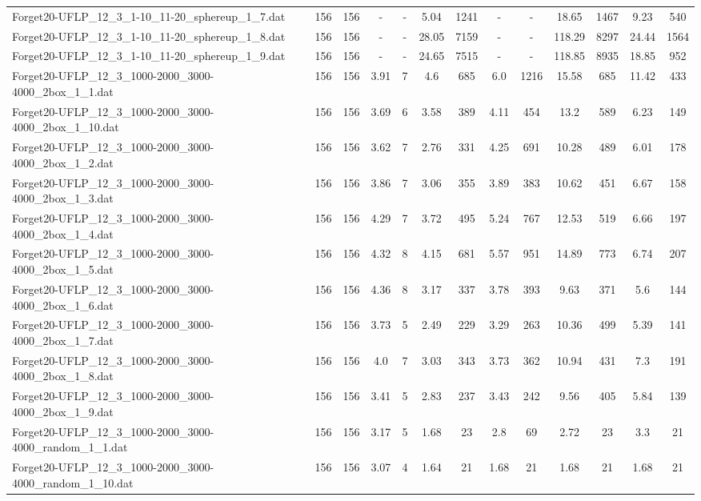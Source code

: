 \begin{table}[!ht]
{\begin{tabular}{lcccccccccccc}
Forget20-UFLP\_12\_3\_1-10\_11-20\_sphereup\_1\_7.dat & 156 & 156 &  - &  - & 5.04 & 1241 &  - &  - & 18.65 & 1467 & 9.23 & 540 \\
Forget20-UFLP\_12\_3\_1-10\_11-20\_sphereup\_1\_8.dat & 156 & 156 &  - &  - & 28.05 & 7159 &  - &  - & 118.29 & 8297 & 24.44 & 1564 \\
Forget20-UFLP\_12\_3\_1-10\_11-20\_sphereup\_1\_9.dat & 156 & 156 &  - &  - & 24.65 & 7515 &  - &  - & 118.85 & 8935 & 18.85 & 952 \\
Forget20-UFLP\_12\_3\_1000-2000\_3000-4000\_2box\_1\_1.dat & 156 & 156 & 3.91 & 7 & 4.6 & 685 & 6.0 & 1216 & 15.58 & 685 & 11.42 & 433 \\
Forget20-UFLP\_12\_3\_1000-2000\_3000-4000\_2box\_1\_10.dat & 156 & 156 & 3.69 & 6 & 3.58 & 389 & 4.11 & 454 & 13.2 & 589 & 6.23 & 149 \\
Forget20-UFLP\_12\_3\_1000-2000\_3000-4000\_2box\_1\_2.dat & 156 & 156 & 3.62 & 7 & 2.76 & 331 & 4.25 & 691 & 10.28 & 489 & 6.01 & 178 \\
Forget20-UFLP\_12\_3\_1000-2000\_3000-4000\_2box\_1\_3.dat & 156 & 156 & 3.86 & 7 & 3.06 & 355 & 3.89 & 383 & 10.62 & 451 & 6.67 & 158 \\
Forget20-UFLP\_12\_3\_1000-2000\_3000-4000\_2box\_1\_4.dat & 156 & 156 & 4.29 & 7 & 3.72 & 495 & 5.24 & 767 & 12.53 & 519 & 6.66 & 197 \\
Forget20-UFLP\_12\_3\_1000-2000\_3000-4000\_2box\_1\_5.dat & 156 & 156 & 4.32 & 8 & 4.15 & 681 & 5.57 & 951 & 14.89 & 773 & 6.74 & 207 \\
Forget20-UFLP\_12\_3\_1000-2000\_3000-4000\_2box\_1\_6.dat & 156 & 156 & 4.36 & 8 & 3.17 & 337 & 3.78 & 393 & 9.63 & 371 & 5.6 & 144 \\
Forget20-UFLP\_12\_3\_1000-2000\_3000-4000\_2box\_1\_7.dat & 156 & 156 & 3.73 & 5 & 2.49 & 229 & 3.29 & 263 & 10.36 & 499 & 5.39 & 141 \\
Forget20-UFLP\_12\_3\_1000-2000\_3000-4000\_2box\_1\_8.dat & 156 & 156 & 4.0 & 7 & 3.03 & 343 & 3.73 & 362 & 10.94 & 431 & 7.3 & 191 \\
Forget20-UFLP\_12\_3\_1000-2000\_3000-4000\_2box\_1\_9.dat & 156 & 156 & 3.41 & 5 & 2.83 & 237 & 3.43 & 242 & 9.56 & 405 & 5.84 & 139 \\
Forget20-UFLP\_12\_3\_1000-2000\_3000-4000\_random\_1\_1.dat & 156 & 156 & 3.17 & 5 & 1.68 & 23 & 2.8 & 69 & 2.72 & 23 & 3.3 & 21 \\
Forget20-UFLP\_12\_3\_1000-2000\_3000-4000\_random\_1\_10.dat & 156 & 156 & 3.07 & 4 & 1.64 & 21 & 1.68 & 21 & 1.68 & 21 & 1.68 & 21 \\

\end{tabular}}
\end{table}
